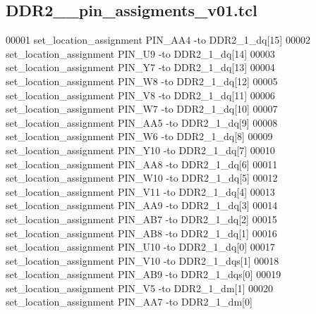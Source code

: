 \subsection{D\+D\+R2\+\_\+\_\+pin\+\_\+assigments\+\_\+v01.\+tcl}
\label{DDR2__1__pin__assigments__v01_8tcl_source}

\begin{DoxyCode}
00001 set\_location\_assignment PIN\_AA4 -to DDR2\_1\_dq[15]\textcolor{comment}{}
00002 \textcolor{comment}{}set\_location\_assignment PIN\_U9 -to DDR2\_1\_dq[14]\textcolor{comment}{}
00003 \textcolor{comment}{}set\_location\_assignment PIN\_Y7 -to DDR2\_1\_dq[13]\textcolor{comment}{}
00004 \textcolor{comment}{}set\_location\_assignment PIN\_W8 -to DDR2\_1\_dq[12]\textcolor{comment}{}
00005 \textcolor{comment}{}set\_location\_assignment PIN\_V8 -to DDR2\_1\_dq[11]\textcolor{comment}{}
00006 \textcolor{comment}{}set\_location\_assignment PIN\_W7 -to DDR2\_1\_dq[10]\textcolor{comment}{}
00007 \textcolor{comment}{}set\_location\_assignment PIN\_AA5 -to DDR2\_1\_dq[9]\textcolor{comment}{}
00008 \textcolor{comment}{}set\_location\_assignment PIN\_W6 -to DDR2\_1\_dq[8]\textcolor{comment}{}
00009 \textcolor{comment}{}set\_location\_assignment PIN\_Y10 -to DDR2\_1\_dq[7]\textcolor{comment}{}
00010 \textcolor{comment}{}set\_location\_assignment PIN\_AA8 -to DDR2\_1\_dq[6]\textcolor{comment}{}
00011 \textcolor{comment}{}set\_location\_assignment PIN\_W10 -to DDR2\_1\_dq[5]\textcolor{comment}{}
00012 \textcolor{comment}{}set\_location\_assignment PIN\_V11 -to DDR2\_1\_dq[4]\textcolor{comment}{}
00013 \textcolor{comment}{}set\_location\_assignment PIN\_AA9 -to DDR2\_1\_dq[3]\textcolor{comment}{}
00014 \textcolor{comment}{}set\_location\_assignment PIN\_AB7 -to DDR2\_1\_dq[2]\textcolor{comment}{}
00015 \textcolor{comment}{}set\_location\_assignment PIN\_AB8 -to DDR2\_1\_dq[1]\textcolor{comment}{}
00016 \textcolor{comment}{}set\_location\_assignment PIN\_U10 -to DDR2\_1\_dq[0]\textcolor{comment}{}
00017 \textcolor{comment}{}set\_location\_assignment PIN\_V10 -to DDR2\_1\_dqs[1]\textcolor{comment}{}
00018 \textcolor{comment}{}set\_location\_assignment PIN\_AB9 -to DDR2\_1\_dqs[0]\textcolor{comment}{}
00019 \textcolor{comment}{}set\_location\_assignment PIN\_V5 -to DDR2\_1\_dm[1]\textcolor{comment}{}
00020 \textcolor{comment}{}set\_location\_assignment PIN\_AA7 -to DDR2\_1\_dm[0]\textcolor{comment}{}

\end{DoxyCode}

